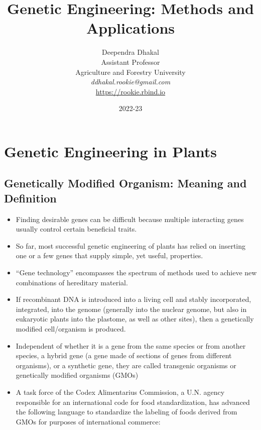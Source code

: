 \documentclass[11pt,dvipsnames,ignorenonframetext,aspectratio=169]{beamer}
\title[]{Genetic Engineering: Methods and Applications}
\author[
        Deependra Dhakal\\
Assistant Professor\\
Agriculture and Forestry University\\
\textit{ddhakal.rookie@gmail.com}\\
\url{https://rookie.rbind.io}
    ]{Deependra Dhakal\\
Assistant Professor\\
Agriculture and Forestry University\\
\textit{ddhakal.rookie@gmail.com}\\
\url{https://rookie.rbind.io}}
\date[
      2022-23
  ]{
      2022-23
        }
\providecommand{\tightlist}{%
  \setlength{\itemsep}{0pt}\setlength{\parskip}{0pt}}
\begin{document}
  \begin{frame}[plain]
  \titlepage
  \end{frame}



\hypertarget{genetic-engineering-in-plants}{%
\section{Genetic Engineering in
Plants}\label{genetic-engineering-in-plants}}

\hypertarget{genetically-modified-organism-meaning-and-definition}{%
\subsection{Genetically Modified Organism: Meaning and
Definition}\label{genetically-modified-organism-meaning-and-definition}}

\begin{frame}{}
\protect\hypertarget{section}{}
\footnotesize

\begin{itemize}
\tightlist
\item
  Finding desirable genes can be difficult because multiple interacting
  genes usually control certain beneficial traits.
\item
  So far, most successful genetic engineering of plants has relied on
  inserting one or a few genes that supply simple, yet useful,
  properties.
\item
  ``Gene technology'' encompasses the spectrum of methods used to
  achieve new combinations of hereditary material.
\item
  If recombinant DNA is introduced into a living cell and stably
  incorporated, integrated, into the genome (generally into the nuclear
  genome, but also in eukaryotic plants into the plastome, as well as
  other sites), then a genetically modified cell/organism is produced.
\item
  Independent of whether it is a gene from the same species or from
  another species, a hybrid gene (a gene made of sections of genes from
  different organisms), or a synthetic gene, they are called transgenic
  organisms or genetically modified organisms (GMOs)
\item
  A task force of the Codex Alimentarius Commission, a U.N. agency
  responsible for an international code for food standardization, has
  advanced the following language to standardize the labeling of foods
  derived from GMOs for purposes of international commerce:
\end{itemize}
\end{frame}
\end{document}
